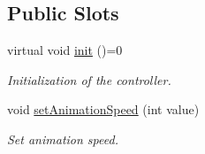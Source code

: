 \subsection*{Public Slots}
\begin{DoxyCompactItemize}
\item 
virtual void \hyperlink{classWorldAbstractController_af2ab5103153a68f66dcdf75d6c9a4d93}{init} ()=0
\begin{DoxyCompactList}\small\item\em Initialization of the controller. \end{DoxyCompactList}\item 
void \hyperlink{classWorldAbstractController_ab271df7d1af98b87afc0d50a4156616a}{set\+Animation\+Speed} (int value)
\begin{DoxyCompactList}\small\item\em Set animation speed. \end{DoxyCompactList}\end{DoxyCompactItemize}
